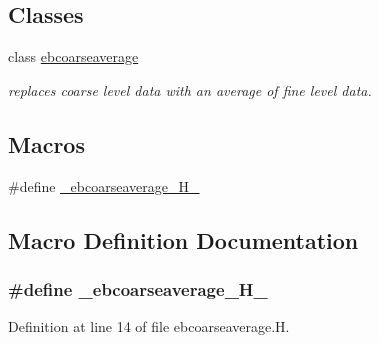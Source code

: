 \subsection*{Classes}
\begin{DoxyCompactItemize}
\item 
class \hyperlink{classebcoarseaverage}{ebcoarseaverage}
\begin{DoxyCompactList}\small\item\em replaces coarse level data with an average of fine level data. \end{DoxyCompactList}\end{DoxyCompactItemize}
\subsection*{Macros}
\begin{DoxyCompactItemize}
\item 
\#define \hyperlink{ebcoarseaverage_8H_ac45103e51e2d88e3511373b73c805324}{\+\_\+ebcoarseaverage\+\_\+\+H\+\_\+}
\end{DoxyCompactItemize}


\subsection{Macro Definition Documentation}
\subsubsection[{\texorpdfstring{\+\_\+ebcoarseaverage\+\_\+\+H\+\_\+}{_ebcoarseaverage_H_}}]{\setlength{\rightskip}{0pt plus 5cm}\#define \+\_\+ebcoarseaverage\+\_\+\+H\+\_\+}\hypertarget{ebcoarseaverage_8H_ac45103e51e2d88e3511373b73c805324}{}\label{ebcoarseaverage_8H_ac45103e51e2d88e3511373b73c805324}


Definition at line 14 of file ebcoarseaverage.\+H.

